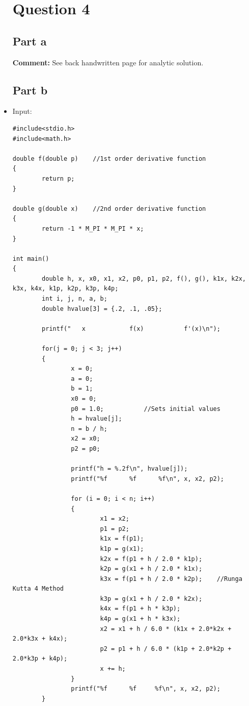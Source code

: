 \documentclass[10pt]{article}
\begin{document}
\begin{itemize}
\section*{Question 4}
\subsection*{Part a}
\textbf{Comment:} See back handwritten page for analytic solution.

\subsection*{Part b}
\item Input:
\begin{verbatim}
#include<stdio.h>
#include<math.h>

double f(double p)    //1st order derivative function
{
        return p;
}

double g(double x)    //2nd order derivative function
{
        return -1 * M_PI * M_PI * x;
}

int main()
{
        double h, x, x0, x1, x2, p0, p1, p2, f(), g(), k1x, k2x, k3x, k4x, k1p, k2p, k3p, k4p;
        int i, j, n, a, b;
        double hvalue[3] = {.2, .1, .05};
        
        printf("   x            f(x)           f'(x)\n");
        
        for(j = 0; j < 3; j++)
        {
                x = 0;
                a = 0;
                b = 1;
                x0 = 0;
                p0 = 1.0;			//Sets initial values
                h = hvalue[j];
                n = b / h;
                x2 = x0;
                p2 = p0;
                
                printf("h = %.2f\n", hvalue[j]);
                printf("%f      %f      %f\n", x, x2, p2);
                
                for (i = 0; i < n; i++)
                {
                        x1 = x2;
                        p1 = p2;
                        k1x = f(p1);
                        k1p = g(x1);
                        k2x = f(p1 + h / 2.0 * k1p);
                        k2p = g(x1 + h / 2.0 * k1x);
                        k3x = f(p1 + h / 2.0 * k2p);    //Runga Kutta 4 Method
                        k3p = g(x1 + h / 2.0 * k2x);
                        k4x = f(p1 + h * k3p);
                        k4p = g(x1 + h * k3x);
                        x2 = x1 + h / 6.0 * (k1x + 2.0*k2x + 2.0*k3x + k4x); 
                        p2 = p1 + h / 6.0 * (k1p + 2.0*k2p + 2.0*k3p + k4p);
                        x += h;
                }
                printf("%f      %f     %f\n", x, x2, p2);
        }


\end{verbatim}
\end{itemize}
\end{document}
